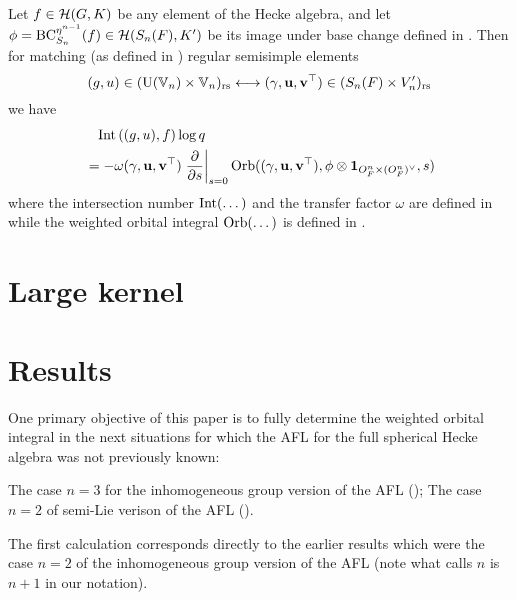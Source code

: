 \begin{conjecture}
  Let $f \in \mathcal H(G, K)$ be any element of the Hecke algebra,
  and let $\phi = \operatorname{BC}_{S_n}^{\eta^{n-1}}(f) \in \mathcal H(S_n(F), K')$ be its image
  under base change defined in .
  Then for matching (as defined in ) regular semisimple elements
  \[ (g, u) \in (\operatorname{U}(\mathbb V_n) \times \mathbb V_n)_{\mathrm{rs}} \longleftrightarrow
    (\gamma, \mathbf u, \mathbf v^\top) \in (S_n(F) \times V_n')_{\mathrm{rs}} \]
  we have
  \begin{equation}
    \begin{aligned}
      &\phantom= \Int\left( (g,u), f \right) \log q \\
      &= -\omega(\gamma, \uu, \vv^\top) \left. \pdv{}{s} \right\rvert_{s=0}
      \Orb( (\gamma, \uu, \vv^\top), \phi \otimes \oneV, s)
    \end{aligned}
  \end{equation}
  where the intersection number $\operatorname{Int}(\dots)$ and the transfer factor $\omega$
  are defined in 
  while the weighted orbital integral $\operatorname{Orb}(\dots)$ is defined in .
  \label{conj:semi_lie_spherical}
\end{conjecture}

\section{Large kernel}

\section{Results}
One primary objective of this paper is to fully determine the weighted orbital integral
in the next situations for which the AFL for the full spherical Hecke algebra
was not previously known:
\begin{itemize}
  \ii The case $n = 3$ for the inhomogeneous group version of the AFL ();
  \ii The case $n = 2$ of semi-Lie verison of the AFL ().
\end{itemize}
The first calculation corresponds directly to the earlier results
\cite[Lemma 7.1.1 and Proposition 7.3.2]{ref:AFLspherical}
which were the case $n = 2$ of the inhomogeneous group version of the AFL
(note what \cite{ref:AFLspherical} calls $n$ is $n+1$ in our notation).

